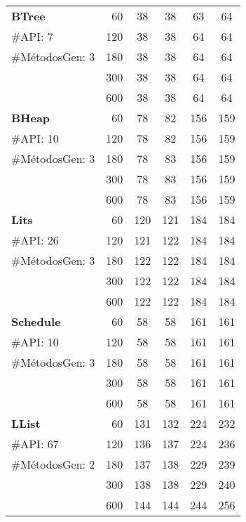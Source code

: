 \begin{table}[H]
{\begin{tabular}{l |r |cc |cc }
\multirow{1}{*}{\textbf{BTree}} 
  & 60 & 38 & 38 & 63 & 64 \\
  {\scriptsize \#API: 7}& 120 & 38 & 38  & 64 & 64 \\
  {\scriptsize \#MétodosGen: 3}& 180 & 38 & 38 & 64 & 64  \\
    & 300 & 38 & 38 & 64 & 64    \\
& 600 & 38 & 38 & 64 & 64  \\
 \hline
\multirow{1}{*}{\textbf{BHeap}} 
  & 60 & 78 & 82& 156 &159 \\
  {\scriptsize \#API: 10}& 120& 78 & 82 & 156& 159  \\
  {\scriptsize \#MétodosGen: 3}&180 & 78 & 83 & 156 & 159 \\
  & 300 & 78 & 83 & 156 & 159  \\
  & 600 &  78 & 83 & 156 & 159 \\
 \hline

\multirow{1}{*}{\textbf{Lits}} 
  & 60 &120 &121 & 184 &184  \\
  {\scriptsize \#API: 26}&120 & 121&122  & 184&184 \\
  {\scriptsize \#MétodosGen: 3}&180 & 122& 122 & 184& 184 \\
  & 300& 122& 122 & 184& 184  \\
& 600 & 122& 122 & 184& 184  \\



\hline
\multirow{1}{*}{\textbf{Schedule}} 
  & 60 & 58&58 & 161&161 \\
  {\scriptsize \#API: 10}&120 & 58&58 & 161&161  \\
  {\scriptsize \#MétodosGen: 3}&180 & 58 &58  &161& 161 \\
  & 300 & 58 &58  &161& 161   \\
  & 600 & 58 &58  &161& 161 \\

\hline

\multirow{1}{*}{\textbf{LList}} 
& 60 & 131  & 132  & 224 & 232 \\
  {\scriptsize \#API: 67}& 120 &136  & 137 & 224 &236 \\
  {\scriptsize \#MétodosGen: 2}& 180 & 137& 138 &  229& 239  \\
    & 300 & 138 & 138 &229 &  240 \\
  & 600 & 144 &  144 & 244&  256\\
\hline


\end{tabular}}
\end{table}
